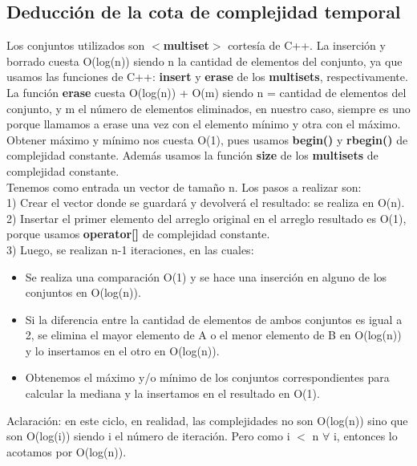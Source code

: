 \subsection{Deducción de la cota de complejidad temporal}
Los conjuntos utilizados son  \textbf{$<$multiset$>$} cortesía de C++. La inserción y borrado cuesta O(log(n)) siendo n la cantidad de elementos del conjunto, ya que usamos las funciones de C++: \textbf{insert} y \textbf{erase} de los \textbf{multisets}, respectivamente. La función \textbf{erase} cuesta O(log(n)) + O(m) siendo n = cantidad de elementos del conjunto, y m el número de elementos eliminados, en nuestro caso, siempre es uno porque llamamos a erase una vez con el elemento mínimo y otra con el máximo.\\
Obtener máximo y mínimo nos cuesta O(1), pues usamos \textbf{begin()} y \textbf{rbegin()} de complejidad constante. Además usamos la función \textbf{size} de los \textbf{multisets} de complejidad constante. \\ 

Tenemos como entrada un vector de tamaño n. Los pasos a realizar son: \\

1) Crear el vector donde se guardará y devolverá el resultado: se realiza en O(n). \\

2) Insertar el primer elemento del arreglo original en el arreglo resultado es O(1), porque usamos \textbf{operator[]} de complejidad constante. \\

3) Luego, se realizan n-1 iteraciones, en las cuales: \\
\begin{itemize}
\item Se realiza una comparación O(1) y se hace una inserción en alguno de los conjuntos en O(log(n)).
\item Si la diferencia entre la cantidad de elementos de ambos conjuntos es igual a 2, se elimina el mayor elemento de A o el menor elemento de B en O(log(n)) y lo insertamos en el otro en O(log(n)).
\item Obtenemos el máximo y/o mínimo de los conjuntos correspondientes para calcular la mediana y la insertamos en el resultado en O(1).
\end{itemize}
Aclaración: en este ciclo, en realidad, las complejidades no son O(log(n)) sino que son O(log(i)) siendo i el número de iteración. Pero como i $<$ n $\forall$ i, entonces lo acotamos por O(log(n)). \\

